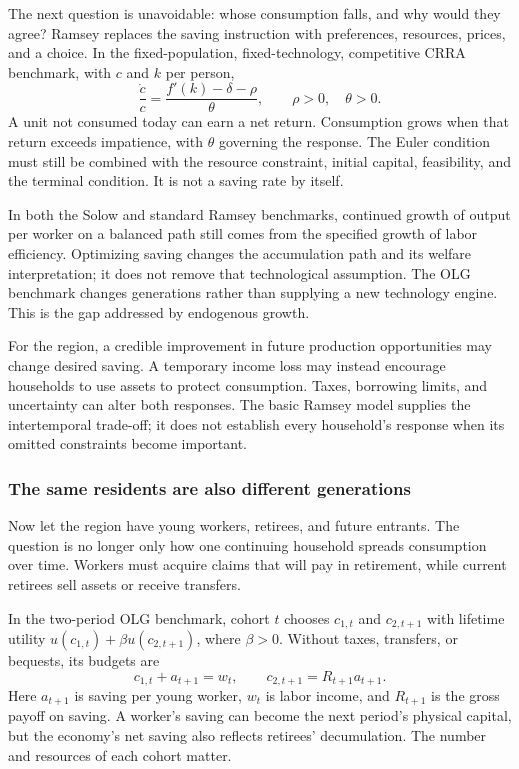 The next question is unavoidable: whose consumption falls, and why would
they agree? Ramsey replaces the saving instruction with preferences,
resources, prices, and a choice. In the fixed-population, fixed-technology,
competitive CRRA benchmark, with $c$ and $k$ per person,
\[
\frac{\dot c}{c}=\frac{f'(k)-\delta-\rho}{\theta},
\qquad \rho>0,\quad\theta>0.
\]
A unit not consumed today can earn a net return. Consumption grows when
that return exceeds impatience, with $\theta$ governing the response.
The Euler condition must still be combined with the resource constraint,
initial capital, feasibility, and the terminal condition. It is not a saving
rate by itself.

In both the Solow and standard Ramsey benchmarks, continued growth of
output per worker on a balanced path still comes from the specified growth
of labor efficiency. Optimizing saving changes the accumulation path and
its welfare interpretation; it does not remove that technological assumption.
The OLG benchmark changes generations rather than supplying a new technology
engine. This is the gap addressed by endogenous growth.

For the region, a credible improvement in future production opportunities
may change desired saving. A temporary income loss may instead encourage
households to use assets to protect consumption. Taxes, borrowing limits,
and uncertainty can alter both responses. The basic Ramsey model supplies
the intertemporal trade-off; it does not establish every household's response
when its omitted constraints become important.

\subsubsection{The same residents are also different generations}

Now let the region have young workers, retirees, and future entrants.
The question is no longer only how one continuing household spreads
consumption over time. Workers must acquire claims that will pay in
retirement, while current retirees sell assets or receive transfers.

In the two-period OLG benchmark, cohort $t$ chooses $c_{1,t}$ and
$c_{2,t+1}$ with lifetime utility $u(c_{1,t})+\beta u(c_{2,t+1})$,
where $\beta>0$. Without taxes, transfers, or bequests, its budgets are
\[
c_{1,t}+a_{t+1}=w_t,
\qquad c_{2,t+1}=R_{t+1}a_{t+1}.
\]
Here $a_{t+1}$ is saving per young worker, $w_t$ is labor income, and
$R_{t+1}$ is the gross payoff on saving. A worker's saving can become the
next period's physical capital, but the economy's net saving also reflects
retirees' decumulation. The number and resources of each cohort matter.

